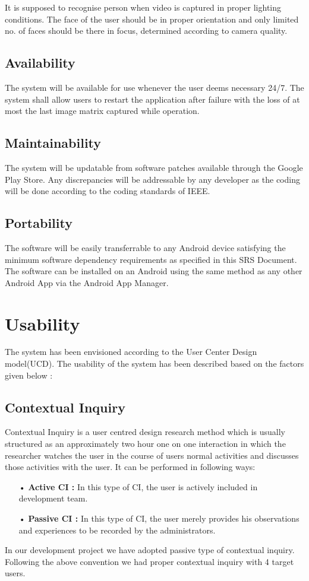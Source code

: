 \documentclass{scrreprt}
\begin{document}
It is supposed to recognise person when video is captured in proper lighting conditions.
The face of the user should be in proper orientation and only limited no. of faces should be there in focus, determined according to camera quality.

\subsection{Availability}
The system will be available for use whenever the user deems necessary 24/7. 
The system shall allow users to restart the application after failure with the loss of at most the last image matrix captured while operation.

\subsection{Maintainability}
The system will be updatable from software patches available through the Google Play Store. Any discrepancies will be addressable by any developer as the coding will be done according to the coding standards of IEEE.

\subsection{Portability}
The software will be easily transferrable to any Android device satisfying the minimum software dependency requirements as specified in this SRS Document. The software can be installed on an Android using the same method as any other Android App via the
Android App Manager.

\section{Usability}
The system has been envisioned according to the User Center Design model(UCD). The usability of the system has been described based on the factors given below :

\subsection{Contextual Inquiry}
Contextual Inquiry is a user centred design research method which is usually structured as an approximately two hour one on one interaction in which the researcher watches the user in the course of users normal activities and discusses those activities with the user.
\linebreak
It can be performed in following ways:
\begin{enumerate}
\item[•] \textbf{Active CI :} In this type of CI, the user is actively included in development team.
\item[•] \textbf{Passive CI :} In this type of CI, the user merely provides his observations and experiences to be recorded by the administrators.
\end{enumerate}
In our development project we have adopted passive type of contextual inquiry. Following the above convention we had proper contextual inquiry with 4 target users.
\end{document}
